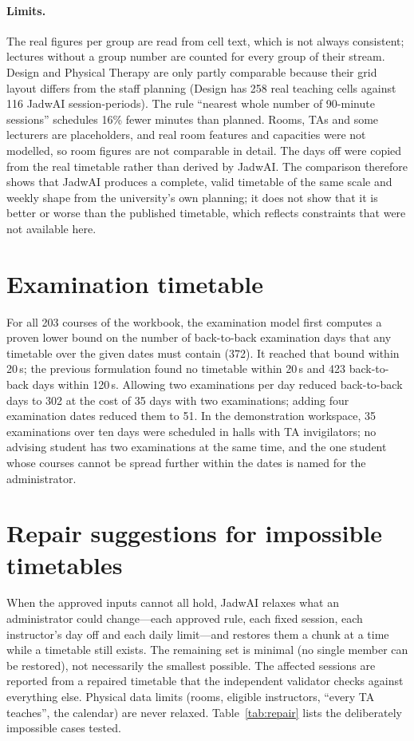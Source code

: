 \paragraph{Limits.} The real figures per group are read from cell text, which is not always consistent; lectures without a group number are counted for every group of their stream. Design and Physical Therapy are only partly comparable because their grid layout differs from the staff planning (Design has 258 real teaching cells against 116 JadwAI session-periods). The rule ``nearest whole number of 90-minute sessions'' schedules 16\% fewer minutes than planned. Rooms, TAs and some lecturers are placeholders, and real room features and capacities were not modelled, so room figures are not comparable in detail. The days off were copied from the real timetable rather than derived by JadwAI. The comparison therefore shows that JadwAI produces a complete, valid timetable of the same scale and weekly shape from the university's own planning; it does not show that it is better or worse than the published timetable, which reflects constraints that were not available here.

\section{Examination timetable}
For all 203 courses of the workbook, the examination model first computes a proven lower bound on the number of back-to-back examination days that any timetable over the given dates must contain (372). It reached that bound within 20\,s; the previous formulation found no timetable within 20\,s and 423 back-to-back days within 120\,s. Allowing two examinations per day reduced back-to-back days to 302 at the cost of 35 days with two examinations; adding four examination dates reduced them to 51. In the demonstration workspace, 35 examinations over ten days were scheduled in halls with TA invigilators; no advising student has two examinations at the same time, and the one student whose courses cannot be spread further within the dates is named for the administrator.

\section{Repair suggestions for impossible timetables}\label{evidence-repair}
When the approved inputs cannot all hold, JadwAI relaxes what an administrator could change---each approved rule, each fixed session, each instructor's day off and each daily limit---and restores them a chunk at a time while a timetable still exists. The remaining set is minimal (no single member can be restored), not necessarily the smallest possible. The affected sessions are reported from a repaired timetable that the independent validator checks against everything else. Physical data limits (rooms, eligible instructors, ``every TA teaches'', the calendar) are never relaxed. Table~\ref{tab:repair} lists the deliberately impossible cases tested.

